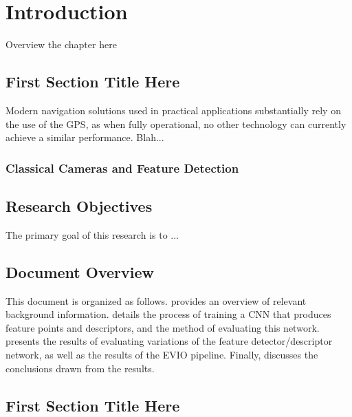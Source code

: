 \chapter{Introduction}
\label{ch:introduction}
\glsresetall
{
Overview the chapter here}

\section{First Section Title Here}
\label{sec:sectionRefNameHere}


Modern navigation solutions used in practical applications substantially rely on the use of the \gls{GPS}, as when fully operational, no other technology can currently achieve a similar performance. Blah...
\subsection{Classical Cameras and Feature Detection}



\section{Research Objectives}

The primary goal of this research is to ...

\section{Document Overview}

This document is organized as follows.  provides an overview of relevant background information.  details the process of training a \gls{CNN} that produces feature points and descriptors, and the method of evaluating this network.  presents the results of evaluating variations of the feature detector/descriptor network, as well as the results of the \gls{EVIO} pipeline. Finally,  discusses the conclusions drawn from the results.


\section{First Section Title Here}
\label{sec:sectionRefNameHere}

